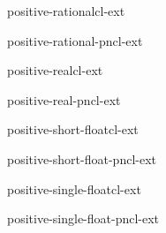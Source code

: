 \begin{type}{positive-rational}{}{cl-ext}{}
  
\end{type}

\begin{function}{positive-rational-p}{n}{cl-ext}{}
  
\end{function}

\begin{type}{positive-real}{}{cl-ext}{}
  
\end{type}

\begin{function}{positive-real-p}{n}{cl-ext}{}
  
\end{function}

\begin{type}{positive-short-float}{}{cl-ext}{}
  
\end{type}

\begin{function}{positive-short-float-p}{n}{cl-ext}{}
  
\end{function}

\begin{type}{positive-single-float}{}{cl-ext}{}
  
\end{type}

\begin{function}{positive-single-float-p}{n}{cl-ext}{}
  
\end{function}
